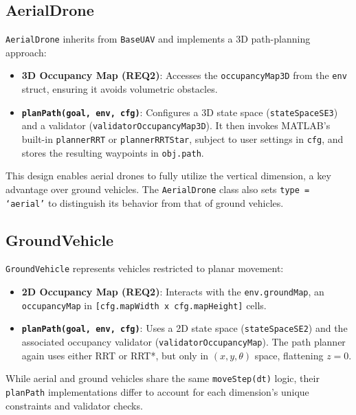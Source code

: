 \documentclass[12pt,a4paper]{report}
\begin{document}
\subsection{AerialDrone}
\label{sec:aerial_drone}
\texttt{AerialDrone} inherits from \texttt{BaseUAV} and implements a 3D path-planning approach:

\begin{itemize}
    \item \textbf{3D Occupancy Map (REQ2)}: 
          Accesses the \texttt{occupancyMap3D} from the \texttt{env} struct, ensuring
          it avoids volumetric obstacles.
    \item \textbf{\texttt{planPath(goal, env, cfg)}}: 
          Configures a 3D state space (\texttt{stateSpaceSE3}) and a validator 
          (\texttt{validatorOccupancyMap3D}). It then invokes MATLAB’s built-in
          \texttt{plannerRRT} or \texttt{plannerRRTStar}, subject to user settings in
          \texttt{cfg}, and stores the resulting waypoints in \texttt{obj.path}.
\end{itemize}

This design enables aerial drones to fully utilize the vertical dimension, a key advantage
over ground vehicles. The \texttt{AerialDrone} class also sets \texttt{type = `aerial'}
to distinguish its behavior from that of ground vehicles.

\subsection{GroundVehicle}
\label{sec:ground_vehicle}
\texttt{GroundVehicle} represents vehicles restricted to planar movement:

\begin{itemize}
    \item \textbf{2D Occupancy Map (REQ2)}:
          Interacts with the \texttt{env.groundMap}, an \texttt{occupancyMap} in
          \texttt{[cfg.mapWidth x cfg.mapHeight]} cells.
    \item \textbf{\texttt{planPath(goal, env, cfg)}}:
          Uses a 2D state space (\texttt{stateSpaceSE2}) and the associated occupancy
          validator (\texttt{validatorOccupancyMap}). The path planner again uses either
          RRT or RRT*, but only in $(x,y,\theta)$ space, flattening $z=0$.
\end{itemize}

While aerial and ground vehicles share the same \texttt{moveStep(dt)} logic, their
\texttt{planPath} implementations differ to account for each dimension’s unique constraints
and validator checks.
\end{document}
